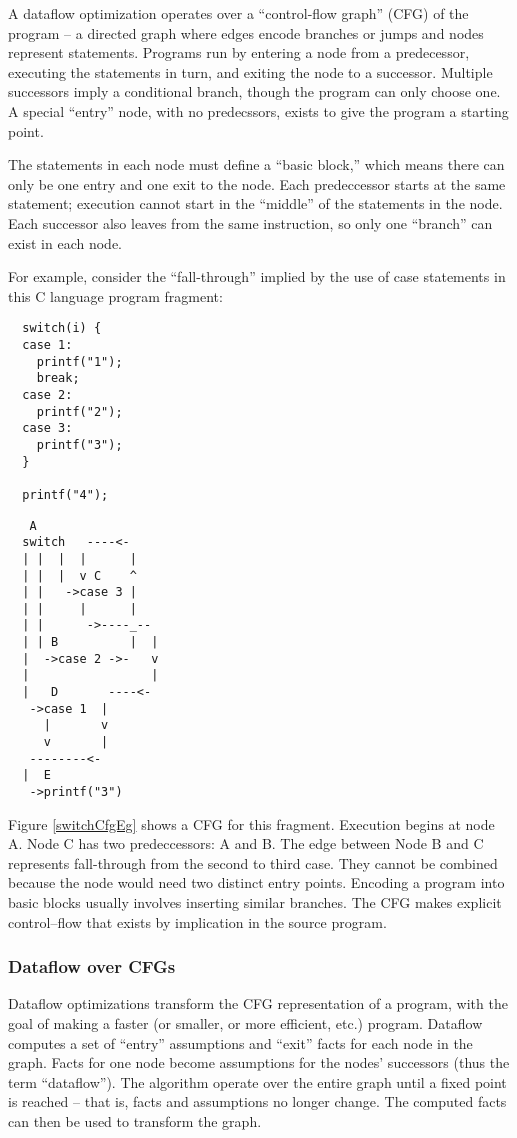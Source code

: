 \documentclass[11pt]{article}
\begin{document}
A dataflow optimization operates over a ``control-flow graph'' (CFG)
of the program -- a directed graph where edges encode branches or
jumps and nodes represent statements. Programs run by entering a node
from a predecessor, executing the statements in turn, and exiting the
node to a successor. Multiple successors imply a conditional branch,
though the program can only choose one. A special ``entry'' node, with
no predecssors, exists to give the program a starting point.

The statements in each node must define a ``basic block,'' which means
there can only be one entry and one exit to the node. Each 
predeccessor starts at the same statement; execution cannot start in
the ``middle'' of the statements in the node. Each successor also
leaves from the same instruction, so only one ``branch'' can exist in
each node.

For example, consider the ``fall-through'' implied by the use of case
statements in this C language program fragment:

\begin{verbatim}
  switch(i) {
  case 1:
    printf("1");
    break;
  case 2:
    printf("2");
  case 3:
    printf("3");
  }

  printf("4");
\end{verbatim}

\begin{verbatim}
   A
  switch   ----<-
  | |  |  |      |
  | |  |  v C    ^
  | |   ->case 3 |
  | |     |      |
  | |      ->----_-- 
  | | B          |  |
  |  ->case 2 ->-   v
  |                 |
  |   D       ----<-
   ->case 1  |
     |       v
     v       |
   --------<-      
  |  E
   ->printf("3")
\end{verbatim}

Figure \ref{switchCfgEg} shows a CFG for this fragment. Execution
begins at node A. Node C has two predeccessors: A and B. The edge
between Node B and C represents fall-through from the second to third
case. They cannot be combined because the node would need two distinct
entry points. Encoding a program into basic blocks usually involves
inserting similar branches. The CFG makes explicit control--flow that
exists by implication in the source program.

\subsubsection{Dataflow over CFGs}

Dataflow optimizations transform the CFG representation of a program,
with the goal of making a faster (or smaller, or more efficient, etc.)
program. Dataflow computes a set of ``entry'' assumptions and ``exit''
facts for each node in the graph. Facts for one node become
assumptions for the nodes' successors (thus the term
``dataflow''). The algorithm operate over the entire graph until a
fixed point is reached -- that is, facts and assumptions no longer
change. The computed facts can then be used to transform the graph.
\end{document}
